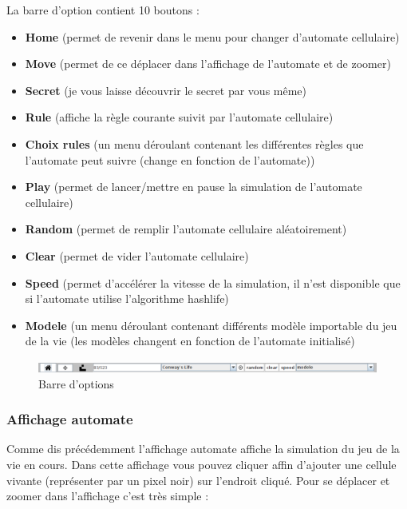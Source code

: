 \par La barre d'option contient 10 boutons :
\begin{itemize}
    \item \textbf{Home} (permet de revenir dans le menu pour changer d'automate cellulaire)
    
    \item \textbf{Move} (permet de ce déplacer dans l'affichage de l'automate et de zoomer)
    
    \item \textbf{Secret} (je vous laisse découvrir le secret par vous même)
    
    \item \textbf{Rule} (affiche la règle courante suivit par l'automate cellulaire)
    
    \item \textbf{Choix rules} (un menu déroulant contenant les différentes règles que l'automate peut suivre (change en fonction de l'automate))
    
    \item \textbf{Play} (permet de lancer/mettre en pause la simulation de l'automate cellulaire)
    
    \item \textbf{Random} (permet de remplir l'automate cellulaire aléatoirement)
    
    \item \textbf{Clear} (permet de vider l'automate cellulaire)
    
    \item \textbf{Speed} (permet d'accélérer la vitesse de la simulation, il n'est disponible que si l'automate utilise l'algorithme hashlife)
    
    \item \textbf{Modele} (un menu déroulant contenant différents modèle importable du jeu de la vie (les modèles changent en fonction de l'automate initialisé)
\end{itemize}

\begin{figure}[H]
    \centering
    \includegraphics[width=1\textwidth]{images/imgInterface/optionBar.png}
    \caption{Barre d'options}
    \label{fig:barre d'options} 
\end{figure}

\subsubsection{Affichage automate}
\par Comme dis précédemment l'affichage automate affiche la simulation du jeu de la vie en cours. Dans cette affichage vous pouvez cliquer affin d'ajouter une cellule vivante (représenter par un pixel noir) sur l'endroit cliqué. Pour se déplacer et zoomer dans l'affichage c'est très simple :

